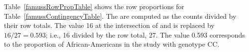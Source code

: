 \newpage

Table~\ref{famussRowPropTable} shows the row proportions for Table~\ref{famussContingencyTable}. The  are computed as the counts divided by their row totals. The value 16 at the intersection of  and  is replaced by $16/27=0.593$; i.e., 16 divided by the row total, 27. The value 0.593 corresponds to the proportion of African-Americans in the study with genotype CC.

